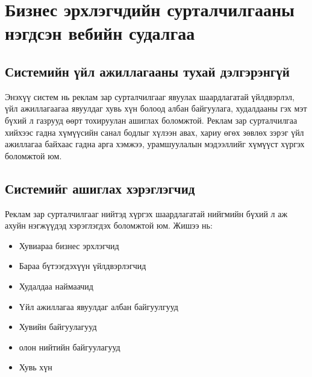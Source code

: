 
\chapter{Бизнес эрхлэгчдийн сурталчилгааны нэгдсэн вебийн судалгаа} %
\label{Chapter2} %

\section{Системийн үйл ажиллагааны тухай дэлгэрэнгүй }
Энэхүү систем нь реклам зар сурталчилгааг явуулах шаардлагатай үйлдвэрлэл, үйл ажиллагаагаа явуулдаг хувь хүн болоод албан байгуулага, худалдааны гэх мэт бүхий л газрууд өөрт тохируулан ашиглах боломжтой. Реклам зар сурталчилгаа хийхээс гадна хүмүүсийн санал бодлыг хүлээн авах, хариу өгөх зөвлөх зэрэг үйл ажиллагаа байхаас гадна арга хэмжээ, урамшуулалын мэдээллийг хүмүүст хүргэх боломжтой юм.

\section{Системийг ашиглах хэрэглэгчид}
Реклам зар сурталчилгааг нийтэд хүргэх шаардлагатай нийгмийн бүхий л аж ахуйн нэгжүүдэд хэрэглэгдэх боломжтой юм.
Жишээ нь: 
\begin{itemize}
\item Хувиараа бизнес эрхлэгчид
\item Бараа бүтээгдэхүүн үйлдвэрлэгчид
\item Худалдаа наймаачид	
\item Үйл ажиллагаа явуулдаг албан байгуулгууд
\item Хувийн байгуулагууд
\item олон нийтийн байгуулагууд
\item Хувь хүн
\end{itemize}
